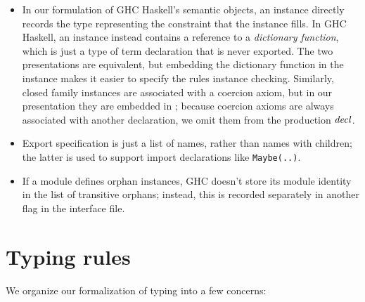 \begin{itemize}
    \item In our formulation of GHC Haskell's semantic objects, an
    instance directly records the type representing the constraint that
    the instance fills.  In GHC Haskell, an instance instead contains a
    reference to a \emph{dictionary function}, which is just a type of
    term declaration that is never exported.  The two presentations are
    equivalent, but embedding the dictionary function in the instance
    makes it easier to specify the rules instance checking.  Similarly,
    closed family instances are associated with a coercion axiom, but in
    our presentation they are embedded in ; because coercion axioms
    are always associated with another declaration, we omit them from the
    production $\mathit{decl}$.

    \item Export specification is just a list of names, rather than names with
    children; the latter is used to support import declarations like
    \verb|Maybe(..)|.

    \item If a module defines orphan instances, GHC doesn't store its module
    identity in the list of transitive orphans; instead, this is recorded
    separately in another flag in the interface file.
\end{itemize}

\section{Typing rules}

We organize our formalization of \Backpack{} typing into a few
concerns:


